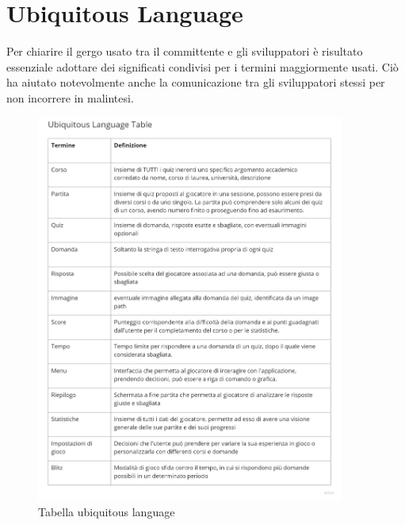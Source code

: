     \section{Ubiquitous Language}
    \label{chap:UbiquitousLanguage}
    Per chiarire il gergo usato tra il committente e gli sviluppatori è risultato essenziale adottare dei significati condivisi per i termini maggiormente usati. Ciò ha aiutato notevolmente anche la comunicazione tra gli sviluppatori stessi per non incorrere in malintesi.
    \begin{figure}[ht]
        \centering
        \includegraphics[width=0.9\textwidth]{Miro/ubiquitous-language.png}
        \caption{Tabella ubiquitous language}
        \label{fig:ubiquitouslanguage}
    \end{figure}
